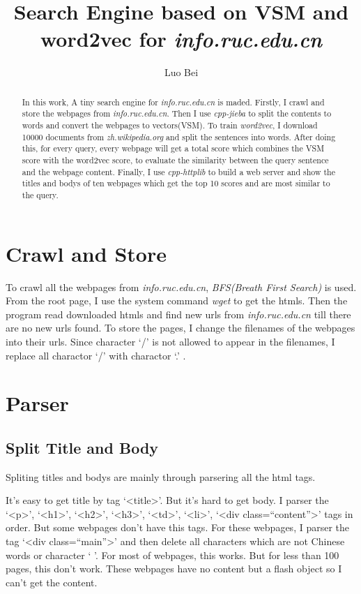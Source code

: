 \documentclass[a4paper]{article}
\title{Search Engine based on VSM and word2vec for \emph{info.ruc.edu.cn} }
\author{Luo Bei}
\begin{document}
\maketitle

\begin{abstract}
In this work, A tiny search engine for \emph{info.ruc.edu.cn} is maded. Firstly, I crawl and store the webpages from \emph{info.ruc.edu.cn}. Then I use \emph{cpp-jieba} to split the contents to words and convert the webpages to vectors(VSM). To train \emph{word2vec}, I download 10000 documents from \emph{zh.wikipedia.org} and split the sentences into words. After doing this, for every query, every webpage will get a total score which combines the VSM score with the word2vec score, to evaluate the similarity between the query sentence and the webpage content. Finally, I use \emph{cpp-httplib} to build a web server and show the titles and bodys of ten webpages which get the top 10 scores and are most similar to the query.
\end{abstract}

\section{Crawl and Store}

To crawl all the webpages from \emph{info.ruc.edu.cn}, \emph{BFS(Breath First Search)} is used. From the root page, I use the system command \emph{wget} to get the htmls. Then the program read downloaded htmls and find new urls from \emph{info.ruc.edu.cn} till there are no new urls found. 
To store the pages, I change the filenames of the webpages into their urls. Since character `/' is not allowed to appear in the filenames, I replace all charactor `/' with charactor `.' .

\section{Parser}

\subsection{Split Title and Body}

Spliting titles and bodys are mainly through parsering all the html tags. 

It's easy to get title by tag `<title>'. But it's hard to get body. I parser the `<p>', `<h1>', `<h2>', `<h3>', `<td>', `<li>', `<div class=``content''>' tags in order. But some webpages don't have this tags. For these webpages, I parser the tag `<div class=``main''>' and then delete all characters which are not Chinese words or character ` '. For most of webpages, this works. But for less than 100 pages, this don't work. These webpages have no content but a flash object so I can't get the content.
\end{document}
